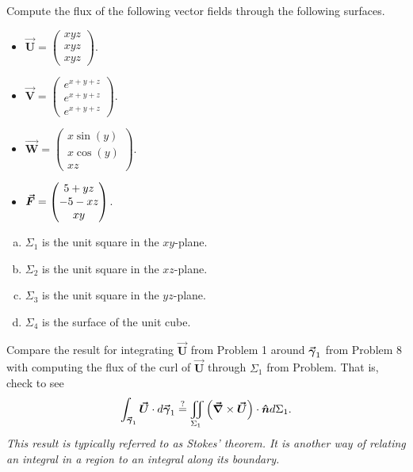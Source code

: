 \documentclass[12pt]{article} %
\newcommand{\vecfieldV}{\boldsymbol{\vec{V}}}
\newcommand{\vecfieldU}{\boldsymbol{\vec{U}}}
\newcommand{\vecfieldW}{\boldsymbol{\vec{W}}}
\begin{document}
\begin{problem}
Compute the flux of the following vector fields through the following surfaces.
\begin{itemize}
    \item $\vecfieldU = \begin{pmatrix} xyz \\ xyz \\ xyz \end{pmatrix}$.
    \item $\vecfieldV = \begin{pmatrix} e^{x+y+z} \\ e^{x+y+z} \\ e^{x+y+z} \end{pmatrix}$.
    \item $\vecfieldW = \begin{pmatrix} x \sin(y) \\ x \cos(y) \\ xz \end{pmatrix}$.
    \item $\boldsymbol{\vec{F}} = \begin{pmatrix} 5 + yz \\ -5 -xz \\ xy \end{pmatrix}$.
\end{itemize}
\begin{multicols}{2}
\begin{enumerate}[(a)]
    \item $\Sigma_1$ is the unit square in the $xy$-plane.  
    \item $\Sigma_2$ is the unit square in the $xz$-plane.
    \item $\Sigma_3$ is the unit square in the $yz$-plane.
    \item $\Sigma_4$ is the surface of the unit cube.
\end{enumerate}
\end{multicols}
\end{problem}

\begin{problem}
Compare the result for integrating $\vecfieldU$ from Problem 1 around $\boldsymbol{\vec{\gamma}}_1$ from Problem 8 with computing the flux of the curl of $\vecfieldU$ through $\Sigma_1$ from Problem. That is, check to see
\[
\int_{\curvegamma_1} \vecfieldU \cdot d\curvegamma_1 \stackrel{?}{=} \iint_{\Sigma_1} \left(\grad \times \vecfieldU \right)\cdot \unitvec d\Sigma_1.
\]
\emph{This result is typically referred to as Stokes' theorem. It is another way of relating an integral in a region to an integral along its boundary.}
\end{problem}
\end{document}
